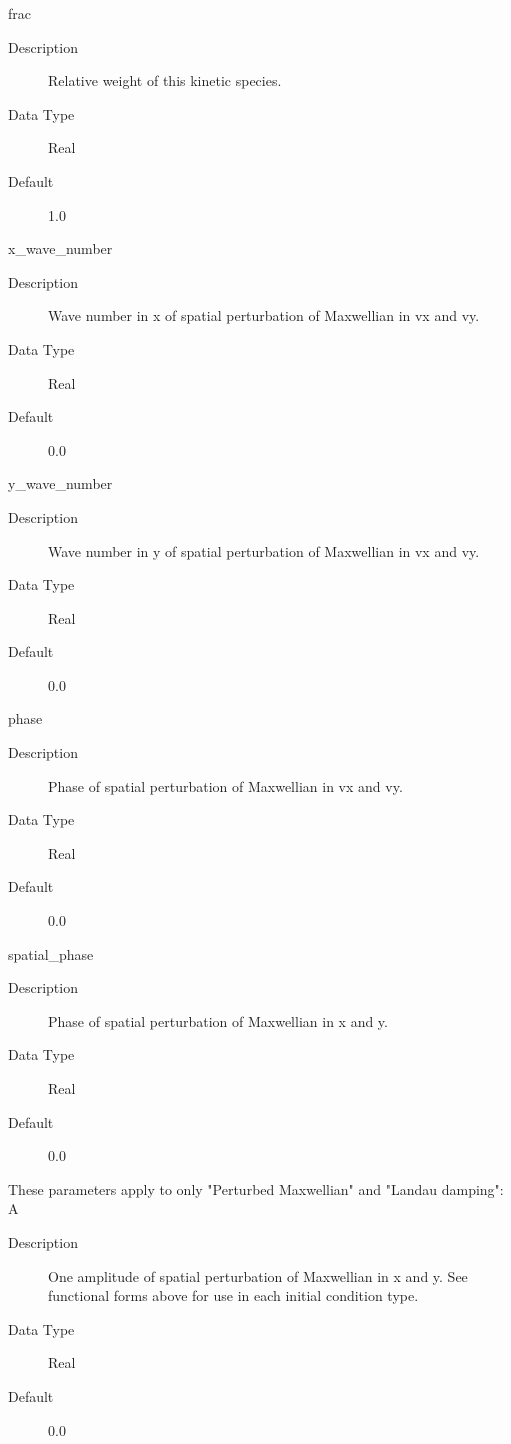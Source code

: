 \documentclass[11pt]{amsart}
\begin{document}
frac
\begin{description}
\item [Description] Relative weight of this kinetic species.
\item [Data Type] Real
\item [Default] 1.0
\end{description}

x\_wave\_number
\begin{description}
\item [Description] Wave number in x of spatial perturbation of Maxwellian in
vx and vy.
\item [Data Type] Real
\item [Default] 0.0
\end{description}

y\_wave\_number
\begin{description}
\item [Description] Wave number in y of spatial perturbation of Maxwellian in
vx and vy.
\item [Data Type] Real
\item [Default] 0.0
\end{description}

phase
\begin{description}
\item [Description] Phase of spatial perturbation of Maxwellian in vx and vy.
\item [Data Type] Real
\item [Default] 0.0
\end{description}

spatial\_phase
\begin{description}
\item [Description] Phase of spatial perturbation of Maxwellian in x and y.
\item [Data Type] Real
\item [Default] 0.0
\end{description}

These parameters apply to only "Perturbed Maxwellian" and "Landau damping": \\
\indent A
\begin{description}
\item [Description] One amplitude of spatial perturbation of Maxwellian in x
and y.  See functional forms above for use in each initial condition type.
\item [Data Type] Real
\item [Default] 0.0
\end{description}
\end{document}
